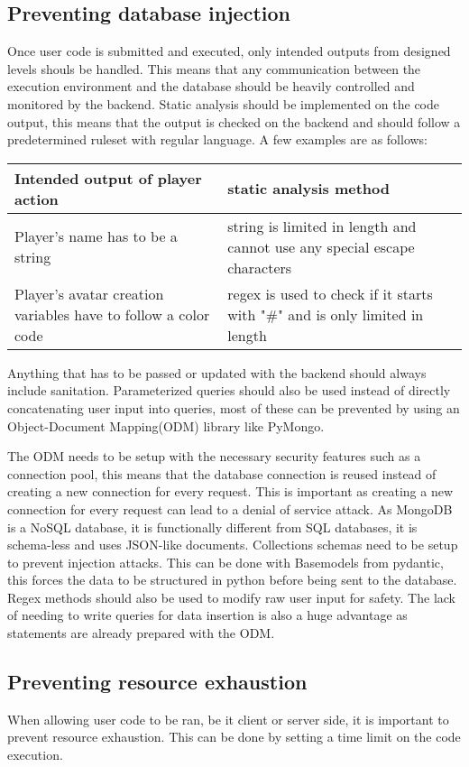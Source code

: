 \subsection{Preventing database injection}
Once user code is submitted and executed, only intended outputs from designed levels shouls be handled. This means that any communication between the execution environment and the database should be heavily controlled and monitored by the backend. Static analysis should be implemented on the code output, this means that the output is checked on the backend and should follow a predetermined ruleset with regular language. A few examples are as follows:
\newline
\begin{tabular}{|p{5cm}|p{11cm}|}
    \hline
    Intended output of player action & static analysis method\\
    \hline
    Player's name has to be a string & string is limited in length and cannot use any special escape characters\\
    \hline
    Player's avatar creation variables have to follow a color code & regex is used to check if it starts with "\#" and is only limited in length\\
    \hline
\end{tabular} 

Anything that has to be passed or updated with the backend should always include sanitation. Parameterized queries should also be used instead of directly concatenating user input into queries, most of these can be prevented by using an Object-Document Mapping(ODM) library like PyMongo. 

The ODM needs to be setup with the necessary security features such as a connection pool, this means that the database connection is reused instead of creating a new connection for every request. This is important as creating a new connection for every request can lead to a denial of service attack. As MongoDB is a NoSQL database, it is functionally different from SQL databases, it is schema-less and uses JSON-like documents. Collections schemas need to be setup to prevent injection attacks. This can be done with Basemodels from pydantic, this forces the data to be structured in python before being sent to the database. Regex methods should also be used to modify raw user input for safety. The lack of needing to write queries for data insertion is also a huge advantage as statements are already prepared with the ODM.

\subsection{Preventing resource exhaustion} 
When allowing user code to be ran, be it client or server side, it is important to prevent resource exhaustion. This can be done by setting a time limit on the code execution.

